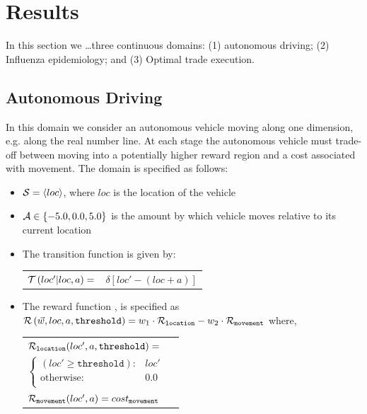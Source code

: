 \section{Results}
\label{sec:results}

In this section we \ldots three continuous domains: (1) autonomous driving; (2) Influenza epidemiology; and (3) Optimal trade execution.

\subsection{Autonomous Driving}
\label{sec:autonomous_driving}

In this domain we consider an autonomous vehicle moving along one dimension, e.g. along the real number line. At each stage the autonomous vehicle must trade-off between moving into a potentially higher reward region and a cost associated with movement. The domain is specified as follows:
\begin{itemize}
    \item {\footnotesize $ \mathcal{S} = \left\langle loc \right\rangle$}, where $ loc $ is the location of the vehicle
    \item {\footnotesize $ \mathcal{A} \in \left\lbrace -5.0, 0.0, 5.0 \right\rbrace $} is the amount by which vehicle moves relative to its current location
    \item The transition function {\footnotesize \Transition} is given by:    \\
    {\footnotesize 
        \abovedisplayskip=5pt
        \belowdisplayskip=0pt
        \renewcommand{\arraystretch}{1.5}
        \begin{tabular}{ll}
            $ \mathcal{T}\left( loc' | loc, a \right) =$ & $ \delta \left[ loc' - (loc + a) \right] $ \\
        \end{tabular}
    }%
    \item The reward function {\footnotesize \Reward}, is specified as {\footnotesize $ \mathcal{R}\left(\vec{w}, loc, a, \mathtt{threshold} \right) = w_1 \cdot \mathcal{R}_{\mathtt{location}} - w_2 \cdot \mathcal{R}_{\mathtt{movement}} $} where, \\
    {\footnotesize 
        \abovedisplayskip=10pt
        \belowdisplayskip=0pt
        \renewcommand{\arraystretch}{1.5}
        \begin{tabular}{ll}    
            $ \mathcal{R}_{\mathtt{location}}(loc', a, \mathtt{threshold}) = $ &  $ $ \\
                \qquad $ \begin{cases}
                (loc' \geq \mathtt{threshold}) : & loc' \\
                \text{otherwise} : & 0.0 \\
                \end{cases} $ & $ $\\
            $ \mathcal{R}_{\mathtt{movement}}(loc', a) = cost_{\mathtt{movement}} $ & $ $ \\                        
        \end{tabular}
    }    
\end{itemize} 

